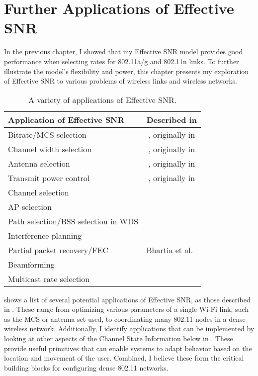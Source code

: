 \ifx\mainfile\undefined

\setcounter{chapter}{7} %
\fi

\cleardoublepage
\chapter{Further Applications of Effective SNR}
\label{chap:applications}

In the previous chapter, I showed that my Effective SNR model provides good performance when selecting rates for 802.11a/g and 802.11n links. To further illustrate the model's flexibility and power, this chapter presents my exploration of Effective SNR to various problems of wireless links and wireless networks.

\begin{table}[htp]
	\centering
	\begin{tabular}{lc}
	\toprule
		\textbf{Application of Effective SNR} & \textbf{Described in} \\
	\midrule
		Bitrate/MCS selection & \chapref{chap:rate}, originally in \cite{Halperin_ESNR}\\
		Channel width selection & \chapref{chap:rate}, originally in \cite{Halperin_ESNR}\\
		Antenna selection & \chapref{chap:rate}, originally in \cite{Halperin_ESNR}\\
		Transmit power control & \chapref{chap:rate}, originally in \cite{Halperin_ESNR}\\
		Channel selection & \secref{sec:esnr_chansel}\\
		AP selection & \secref{sec:esnr_apsel}\\
		Path selection/BSS selection in WDS & \secref{sec:esnr_pathsel}\\
		Interference planning \\
		Partial packet recovery/FEC & Bhartia et al.~\cite{Bhartia_FreqDiv}\\
		Beamforming \\
		Multicast rate selection \\
	\bottomrule
	\end{tabular}
	\caption[A variety of applications of Effective SNR]{\label{tab:esnr_uses}A variety of applications of Effective SNR\@.}
\end{table}

 shows a list of several potential applications of Effective SNR, as those described in . These range from optimizing various parameters of a single Wi-Fi link, such as the MCS or antenna set used, to coordinating many 802.11 nodes in a dense wireless network. Additionally, I identify applications that can be implemented by looking at other aspects of the Channel State Information below in . These provide useful primitives that can enable systems to adapt behavior based on the location and movement of the user. Combined, I believe these form the critical building blocks for configuring dense 802.11 networks.

